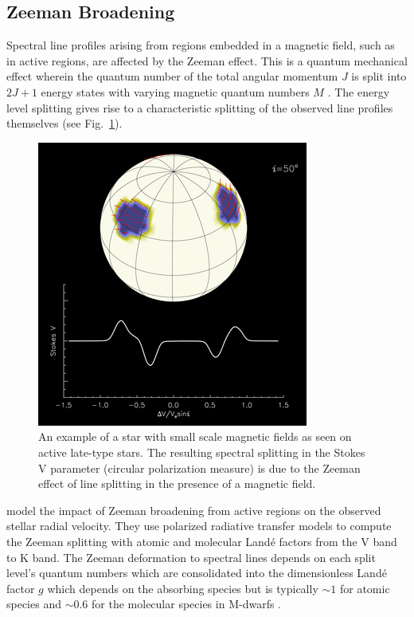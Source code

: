 \subsection{Zeeman Broadening} \label{sect:zeeman}
Spectral line profiles arising from regions embedded in a magnetic field, such as in active 
regions, are affected by the Zeeman effect. This is a quantum mechanical effect wherein 
the quantum number of the total angular momentum $J$ is split into $2J+1$ energy states 
with varying magnetic quantum numbers $M$ \parencite{reiners12c}. 
The energy level splitting gives rise to a characteristic splitting of the observed line 
profiles themselves (see Fig.~\ref{fig:zeeman}). \\

\begin{figure}
\centering
\includegraphics[scale=.5]{figures/zeeman.png}
\caption{An example of a star with small scale magnetic fields as seen on active late-type 
stars. The resulting spectral splitting in the Stokes V parameter (circular polarization 
measure) is due to the Zeeman effect of line splitting in the presence of a magnetic field. 
\parencite[Image credit:][]{kochukhov16} \label{fig:zeeman}}
\end{figure}

\cite{reiners13} model the impact of Zeeman broadening from active regions on the observed 
stellar radial velocity. They use polarized radiative transfer models to compute the  
Zeeman splitting with atomic and molecular Land\'{e} factors from the V band to K band. 
The Zeeman deformation to spectral lines 
depends on each split level's quantum numbers which are consolidated 
into the dimensionless Land\'{e} factor $g$ 
which depends on the absorbing species but is typically $\sim 1$ for atomic 
species and 
$\sim 0.6$ for the molecular species in M-dwarfs \parencite{shulyak10,reiners13}. \\

